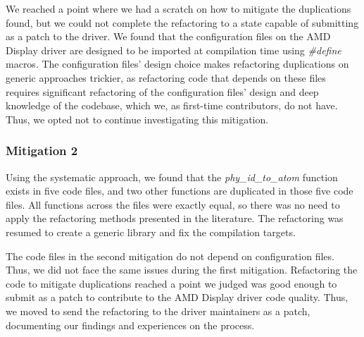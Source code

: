 \documentclass[10pt,conference]{IEEEtran}
\begin{document}
We reached a point where we had a scratch on how to mitigate the duplications found, but we could not complete the refactoring to a state capable of submitting as a patch to the driver. We found that the configuration files on the AMD Display driver are designed to be imported at compilation time using \textit{\#define} macros. The configuration files' design choice makes refactoring duplications on generic approaches trickier, as refactoring code that depends on these files requires significant refactoring of the configuration files' design and deep knowledge of the codebase, which we, as first-time contributors, do not have. Thus, we opted not to continue investigating this mitigation.

\subsubsection{Mitigation 2}

Using the systematic approach, we found that the \textit{phy\_id\_to\_atom} function exists in five code files, and two other functions are duplicated 
in those five code files. All functions across the files were exactly equal, 
so there was no need to apply the refactoring methods presented in the literature. 
The refactoring was resumed to create a generic library and fix the compilation targets.

The code files in the second mitigation do not depend on configuration files. Thus, 
we did not face the same issues during the first mitigation. Refactoring the code 
to mitigate duplications reached a point we judged was good enough to submit as a 
patch to contribute to the AMD Display driver code quality. Thus, we moved to send 
the refactoring to the driver maintainers as a patch, documenting our findings and experiences 
on the process.


\end{document}
